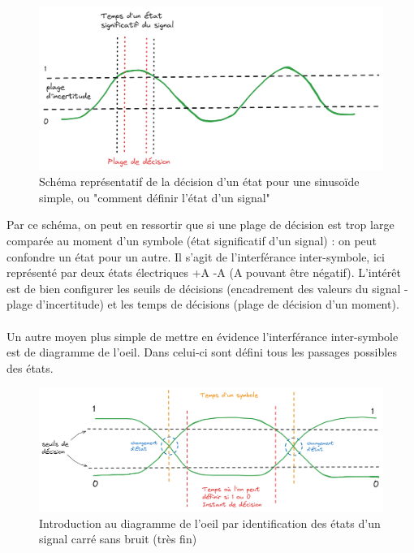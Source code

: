 \begin{figure}[h]
    \centering
    \includegraphics[width=1\linewidth]{imgs/td.png}
    \caption{Schéma représentatif de la décision d'un état pour une sinusoïde simple, ou "comment définir l'état d'un signal"}
    \label{fig:td}
\end{figure}

Par ce schéma, on peut en ressortir que si une plage de décision est trop large comparée au moment d'un symbole (état significatif d'un signal) : on peut confondre un état pour un autre. Il s'agit de l'interférance inter-symbole, ici représenté par deux états électriques +A -A (A pouvant être négatif). L'intérêt est de bien configurer les seuils de décisions (encadrement des valeurs du signal - plage d'incertitude) et les temps de décisions (plage de décision d'un moment).
\\ \\
Un autre moyen plus simple de mettre en évidence l'interférance inter-symbole est de diagramme de l'oeil. Dans celui-ci sont défini tous les passages possibles des états.

\begin{figure}[h]
    \centering
    \includegraphics[width=1\linewidth]{imgs/seuils.png}
    \caption{Introduction au diagramme de l'oeil par identification des états d'un signal carré sans bruit (très fin)}
    \label{fig:seuils}
\end{figure}

